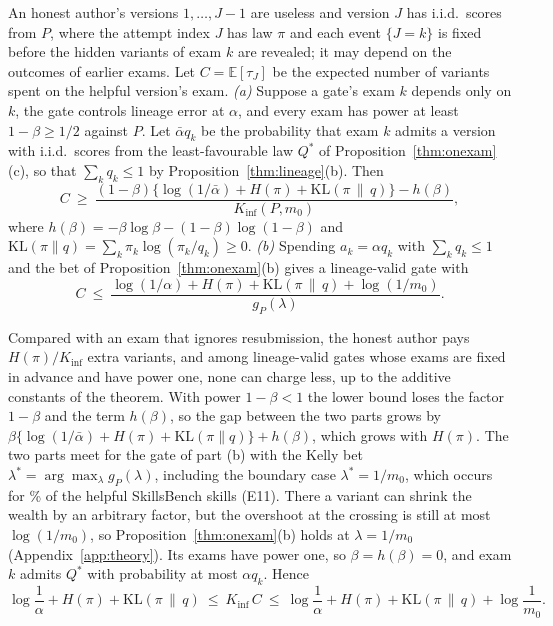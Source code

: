 \begin{theorem}\label{thm:price}
An honest author's versions $1,\dots,J-1$ are useless and version $J$ has i.i.d.\ scores from $P$, where the attempt index $J$ has law $\pi$ and each event $\{J=k\}$ is fixed before the hidden variants of exam $k$ are revealed; it may depend on the outcomes of earlier exams. Let $C=\mathbb E[\tau_J]$ be the expected number of variants spent on the helpful version's exam.
\emph{(a)} Suppose a gate's exam $k$ depends only on $k$, the gate controls lineage error at $\alpha$, and every exam has power at least $1-\beta\ge1/2$ against $P$. Let $\bar\alpha q_k$ be the probability that exam $k$ admits a version with i.i.d.\ scores from the least-favourable law $Q^*$ of Proposition~\ref{thm:onexam}(c), so that $\sum_kq_k\le1$ by Proposition~\ref{thm:lineage}(b). Then
\[
C\ \ge\ \frac{(1-\beta)\{\log(1/\bar\alpha)+H(\pi)+\mathrm{KL}(\pi\,\|\,q)\}-h(\beta)}{K_{\inf}(P,m_0)},
\]
where $h(\beta)=-\beta\log\beta-(1-\beta)\log(1-\beta)$ and $\mathrm{KL}(\pi\|q)=\sum_k\pi_k\log(\pi_k/q_k)\ge0$.
\emph{(b)} Spending $a_k=\alpha q_k$ with $\sum_kq_k\le1$ and the bet of Proposition~\ref{thm:onexam}(b) gives a lineage-valid gate with
\[
C\ \le\ \frac{\log(1/\alpha)+H(\pi)+\mathrm{KL}(\pi\,\|\,q)+\log(1/m_0)}{g_P(\lambda)}.
\]
\end{theorem}
Compared with an exam that ignores resubmission, the honest author pays $H(\pi)/K_{\inf}$ extra variants, and among lineage-valid gates whose exams are fixed in advance and have power one, none can charge less, up to the additive constants of the theorem. With power $1-\beta<1$ the lower bound loses the factor $1-\beta$ and the term $h(\beta)$, so the gap between the two parts grows by $\beta\{\log(1/\bar\alpha)+H(\pi)+\mathrm{KL}(\pi\|q)\}+h(\beta)$, which grows with $H(\pi)$. The two parts meet for the gate of part (b) with the Kelly bet $\lambda^*=\arg\max_\lambda g_P(\lambda)$, including the boundary case $\lambda^*=1/m_0$, which occurs for \NThAllIn\% of the helpful SkillsBench skills (E11). There a variant can shrink the wealth by an arbitrary factor, but the overshoot at the crossing is still at most $\log(1/m_0)$, so Proposition~\ref{thm:onexam}(b) holds at $\lambda=1/m_0$ (Appendix~\ref{app:theory}). Its exams have power one, so $\beta=h(\beta)=0$, and exam $k$ admits $Q^*$ with probability at most $\alpha q_k$. Hence
\begin{equation}\label{eq:sandwich}
\log\frac1\alpha+H(\pi)+\mathrm{KL}(\pi\,\|\,q)\ \le\ K_{\inf}\,C\ \le\ \log\frac1\alpha+H(\pi)+\mathrm{KL}(\pi\,\|\,q)+\log\frac1{m_0}.
\end{equation}
